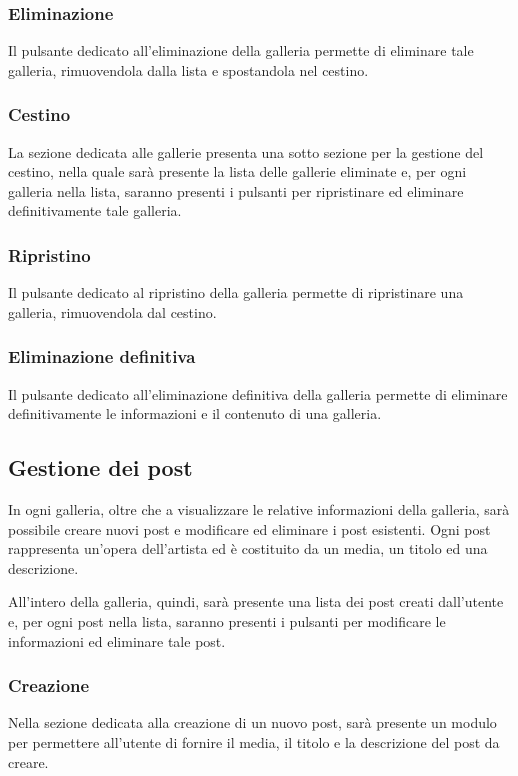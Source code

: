 \subsubsection{Eliminazione}
Il pulsante dedicato all'eliminazione della galleria permette di eliminare tale galleria, rimuovendola dalla lista e spostandola nel cestino.

\subsubsection{Cestino}
La sezione dedicata alle gallerie presenta una sotto sezione per la gestione del cestino, nella quale sar\`a presente la lista delle gallerie eliminate e, per ogni galleria nella lista, saranno presenti i pulsanti per ripristinare ed eliminare definitivamente tale galleria.

\subsubsection{Ripristino}
Il pulsante dedicato al ripristino della galleria permette di ripristinare una galleria, rimuovendola dal cestino.

\subsubsection{Eliminazione definitiva}
Il pulsante dedicato all'eliminazione definitiva della galleria permette di eliminare definitivamente le informazioni e il contenuto di una galleria.

\subsection{Gestione dei post}
In ogni galleria, oltre che a visualizzare le relative informazioni della galleria, sar\`a possibile creare nuovi post e modificare ed eliminare i post esistenti. Ogni post rappresenta un'opera dell'artista ed \`e costituito da un media, un titolo ed una descrizione.

All'intero della galleria, quindi, sar\`a presente una lista dei post creati dall'utente e, per ogni post nella lista, saranno presenti i pulsanti per modificare le informazioni ed eliminare tale post.

\subsubsection{Creazione}
Nella sezione dedicata alla creazione di un nuovo post, sar\`a presente un modulo per permettere all'utente di fornire il media, il titolo e la descrizione del post da creare.

